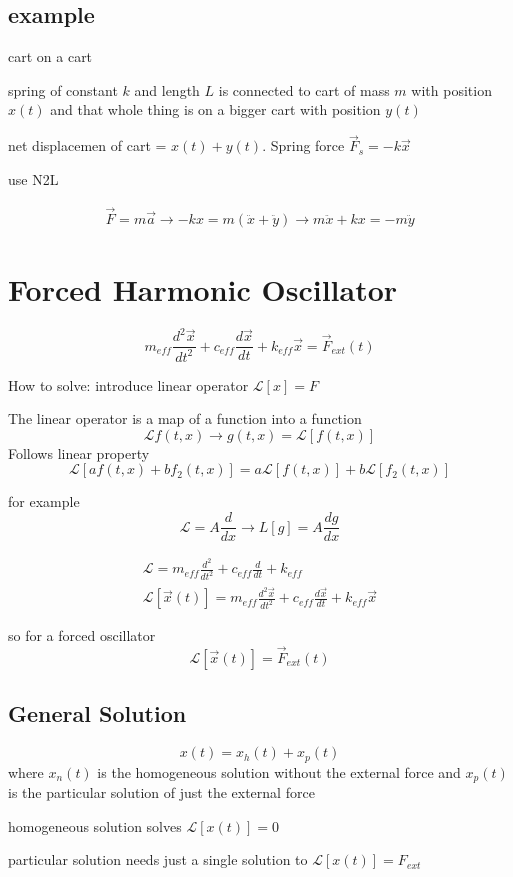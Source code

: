 \documentclass[fleqn]{report}
\newcommand{\equations} [1] {
\begin{gather*}
#1
\end{gather*}
}
\begin{document}
\subsection{example}
cart on a cart 

spring of constant $k$ and length $L$ is connected to cart of mass $m$ with position $x(t)$ and that whole thing is on a bigger cart with position $y(t)$ 

net displacemen of cart = $x(t) + y(t)$. Spring force $\vec F_s = -k \vec x$

use N2L 
\equations{
    \vec F = m \vec a \rightarrow -kx = m (\ddot x + \ddot y)
    \rightarrow 
    m \ddot x + kx = -m \ddot y
}

\section{Forced Harmonic Oscillator}
\[
m_{eff} \frac{d^2 \vec x}{dt^2} + c_{eff} \frac{d \vec x}{dt} + k_{eff} \vec x = \vec F_{ext}(t)
\]

How to solve: introduce linear operator $\mathcal{L}[x] = F$

The linear operator is a map of a function into a function 
\[
\mathcal{L} f(t, x) \rightarrow g(t, x) = \mathcal{L}[f(t, x)]
\]
Follows linear property
\[
\mathcal{L}[a f(t, x) + b f_2(t, x)] = a \mathcal{L}[f(t, x)] + b \mathcal{L}[f_2(t, x)]
\]

for example 
\[
\mathcal{L} = A \frac{d}{dx}
\rightarrow 
L[g] = A \frac{dg}{dx}
\]

\equations{
    \mathcal{L} = 
    m_{eff} \frac{d^2}{dt^2} + c_{eff} \frac{d}{dt} + k_{eff} 
    \\
    \mathcal{L}[\vec x(t)] = 
    m_{eff} \frac{d^2 \vec x}{dt^2} + c_{eff} \frac{d \vec x}{dt} + k_{eff} \vec x 
}

so for a forced oscillator 
\[
\mathcal{L}[\vec x(t)] = \vec F_{ext}(t)
\]

\subsection{General Solution}
\[
x(t) = x_h(t) + x_p(t)
\]
where $x_n(t)$ is the homogeneous solution without the external force and $x_p(t)$ is the particular solution of just the external force 

homogeneous solution solves $\mathcal{L}[x(t)] = 0$

particular solution needs just a single solution to $\mathcal{L}[x(t)] = F_{ext}$
\end{document}
